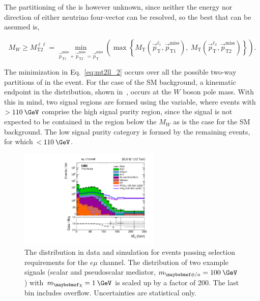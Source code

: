 The partitioning of the \ptvecmiss is however unknown, since neither the energy nor direction of either neutrino four-vector can be resolved, so the best that can be assumed is, 

\begin{equation}
  M_{W} \geq M_{\text{T2}}^{\ell\ell} = \min_{\vec{p}^{\text{miss}}_{\text{T1}}+\vec{p}^{\text{miss}}_{\text{T2}}=\vec{p}^{\text{miss}}_{\text{T}}}\left(\max\left\{M_{\text{T}}\left(\vec{p}^{\ell_1}_{\text{T}},\vec{p}^{\text{miss}}_{\text{T1}}\right),\:M_{\text{T}}\left(\vec{p}^{\ell_2}_{\text{T}},\vec{p}^{\text{miss}}_{\text{T2}}\right)\right\}\right).
\label{eq:mt2ll_2}
\end{equation}

The minimization in Eq.~\ref{eq:mt2ll_2} occurs over all the possible two-way partitions of \ptvecmiss in the event. For the case of the SM \ttll background, a kinematic endpoint in the \mttll distribution, shown in~, occurs at the $W$ boson pole mass. With this in mind, two signal regions are formed using the \mttll variable, where events with \mttll$>110\:\GeV$ comprise the high signal purity region, since the signal is not expected to be contained in the region below the $M_W$ as is the case for the SM \ttll background. The low signal purity category is formed by the remaining events, for which \mttll$<110\:\GeV$.

\begin{figure}
  \includegraphics[width=0.6\textwidth]{figs/mt2log_em.pdf}
  \caption{The \mttll distribution in data and simulation for events passing selection requirements for the $e\mu$ channel. The distribution of two example signals (scalar and pseudoscalar mediator, $m_{\phi/a} = 100\:\GeV$) with $m_{\chi}=1\:\GeV$ is scaled up by a factor of 200. The last bin includes overflow. Uncertainties are statistical only.}
  \label{fig:mt2ll}
\end{figure}



